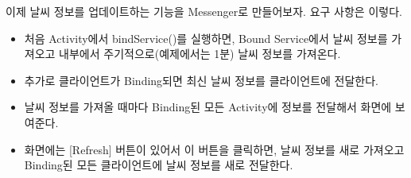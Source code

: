 이제 날씨 정보를 업데이트하는 기능을 Messenger로 만들어보자. 요구 사항은 이렇다.
\begin{itemize}
\item 처음 Activity에서 bindService()를 실행하면, Bound Service에서 날씨 정보를 가져오고 내부에서 주기적으로(예제에서는 1분) 날씨 정보를 가져온다.
\item 추가로 클라이언트가 Binding되면 최신 날씨 정보를 클라이언트에 전달한다.
\item 날씨 정보를 가져올 때마다 Binding된 모든 Activity에 정보를 전달해서 화면에 보여준다.
\item 화면에는 [Refresh] 버튼이 있어서 이 버튼을 클릭하면, 날씨 정보를 새로 가져오고 Binding된 모든 클라이언트에 날씨 정보를 새로 전달한다.
\end{itemize}


